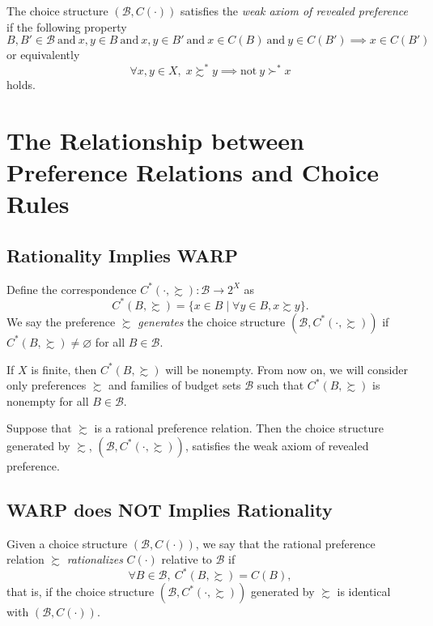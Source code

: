 \documentclass[11pt,fleqn]{book} %
\begin{document}
\begin{definition}
	The choice structure $(\mathcal{B},C(\cdot))$ satisfies the \emph{weak axiom of revealed preference} if the following property
	\[
	B,B'\in \mathcal{B}\ \text{and}\ x,y\in B\ \text{and}\ x,y\in B'\ \text{and}\ x\in C(B)\ \text{and}\ y\in C(B')\implies x\in C(B')
	\]
	or equivalently
	\[
	\forall x,y\in X,\;x\succsim^*y\implies\text{not}\ y\succ^*x
	\]
	holds.
\end{definition}

\section{The Relationship between Preference Relations and Choice Rules }

\subsection{Rationality Implies WARP}
\vspace{4pt}
\begin{definition}
	Define the correspondence $C^*(\cdot,\succsim):\mathcal{B}\rightarrow 2^X$ as 
	\[
	C^*(B,\succsim)=\{x\in B\;|\;\forall y\in B, x\succsim y\}.
	\]
	We say the preference $\succsim$ \emph{generates} the choice structure $(\mathcal{B},C^*(\cdot,\succsim))$ if $C^*(B,\succsim)\ne\varnothing$ for all $B\in\mathcal{B}$.
	
\end{definition}

\begin{remark}
    If $X$ is finite, then $C^*(B,\succsim)$ will be nonempty. From now on, we will consider only preferences $\succsim$ and families of budget sets $\mathcal{B}$ such that $C^*(B,\succsim)$ is nonempty for all $B\in\mathcal{B}$.
\end{remark}

\begin{proposition}
	Suppose that $\succsim$ is a rational preference relation. Then the choice structure generated by $\succsim$, $(\mathcal{B},C^*(\cdot,\succsim))$, satisfies the weak axiom of revealed preference. 
\end{proposition}

\subsection{WARP does NOT Implies Rationality}
\vspace{4pt}
\begin{definition}[Rationalization]
	Given a choice structure $(\mathcal{B},C(\cdot))$, we say that the rational preference	relation $\succsim$ \emph{rationalizes} $C(\cdot)$ relative to $\mathcal{B}$ if
	\[
	\forall B\in\mathcal{B},\ C^*(B,\succsim)=C(B),
	\]
	that is, if the choice structure $(\mathcal{B},C^*(\cdot,\succsim))$  generated by $\succsim$ is identical with $(\mathcal{B},C(\cdot))$.
\end{definition}
\end{document}
